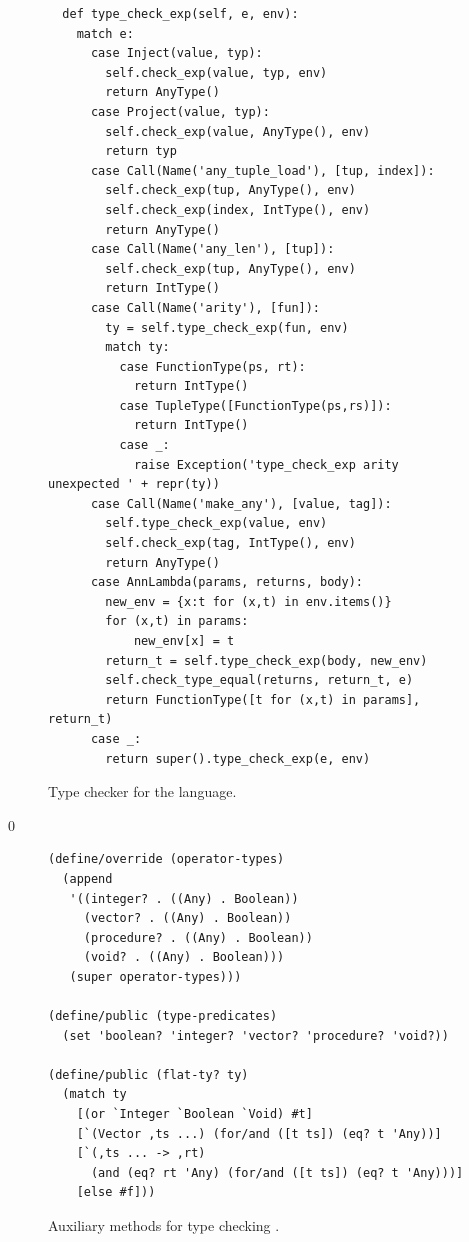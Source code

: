 \documentclass[7x10]{TimesAPriori_MIT}%
\def\racketEd{0}
\def\edition{1}
\numberwithin{theorem}{chapter}
\numberwithin{definition}{chapter}
\numberwithin{equation}{chapter}
\begin{document}
\begin{figure}[btp]
\begin{tcolorbox}[colback=white]
{\begin{lstlisting}
  def type_check_exp(self, e, env):
    match e:
      case Inject(value, typ):
        self.check_exp(value, typ, env)
        return AnyType()
      case Project(value, typ):
        self.check_exp(value, AnyType(), env)
        return typ
      case Call(Name('any_tuple_load'), [tup, index]):
        self.check_exp(tup, AnyType(), env)
        self.check_exp(index, IntType(), env)
        return AnyType()
      case Call(Name('any_len'), [tup]):
        self.check_exp(tup, AnyType(), env)
        return IntType()
      case Call(Name('arity'), [fun]):
        ty = self.type_check_exp(fun, env)
        match ty:
          case FunctionType(ps, rt):
            return IntType()
          case TupleType([FunctionType(ps,rs)]):
            return IntType()
          case _:
            raise Exception('type_check_exp arity unexpected ' + repr(ty))
      case Call(Name('make_any'), [value, tag]):
        self.type_check_exp(value, env)
        self.check_exp(tag, IntType(), env)
        return AnyType()
      case AnnLambda(params, returns, body):
        new_env = {x:t for (x,t) in env.items()}
        for (x,t) in params:
            new_env[x] = t
        return_t = self.type_check_exp(body, new_env)
        self.check_type_equal(returns, return_t, e)
        return FunctionType([t for (x,t) in params], return_t)
      case _:
        return super().type_check_exp(e, env)
\end{lstlisting}
\fi}
  \end{tcolorbox}

  \caption{Type checker for the \LangAny{} language.}
\label{fig:type-check-Lany}
\end{figure}

{\if\edition\racketEd
\begin{figure}[tbp]
  \begin{tcolorbox}[colback=white]
\begin{lstlisting}
(define/override (operator-types)
  (append
   '((integer? . ((Any) . Boolean))
     (vector? . ((Any) . Boolean))
     (procedure? . ((Any) . Boolean))
     (void? . ((Any) . Boolean)))
   (super operator-types)))

(define/public (type-predicates)
  (set 'boolean? 'integer? 'vector? 'procedure? 'void?))

(define/public (flat-ty? ty)
  (match ty
    [(or `Integer `Boolean `Void) #t]
    [`(Vector ,ts ...) (for/and ([t ts]) (eq? t 'Any))]
    [`(,ts ... -> ,rt)
      (and (eq? rt 'Any) (for/and ([t ts]) (eq? t 'Any)))]
    [else #f]))
\end{lstlisting}
\end{tcolorbox}

\caption{Auxiliary methods for type checking \LangAny{}.}
\label{fig:type-check-Lany-aux}
\end{figure}
\fi}
\end{document}
